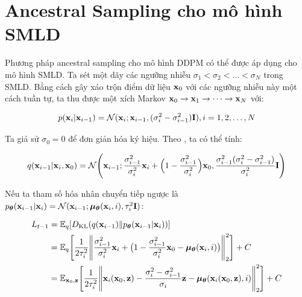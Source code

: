 \documentclass{article} %
\begin{document}
\section{Ancestral Sampling cho mô hình SMLD} \label{F}

Phương pháp ancestral sampling cho mô hình DDPM có thể được áp dụng cho mô hình SMLD.
Ta sét một dãy các ngưỡng nhiễu $\sigma_1 < \sigma_2 < \dots < \sigma_N$ trong SMLD.
Bằng cách gây xáo trộn điểm dữ liệu $\bold{x}_0$ với các ngưỡng nhiễu này một cách tuần tự, ta thu được một xích Markov $\bold{x}_0 \rightarrow \bold{x}_1 \rightarrow \dots \rightarrow \bold{x}_N$ với:

\begin{equation*}
    p(\bold{x}_i \vert \bold{x}_{i-1}) = \mathcal{N}(\bold{x}_i; \bold{x}_{i-1}, (\sigma_i^2 - \sigma_{i-1}^2) \bold{I}), i = 1, 2, \dots, N
\end{equation*}

Ta giả sử $\sigma_0 = 0$ để đơn giản hóa ký hiệu.
Theo \citep{ho2020denoising}, ta có thể tính:

\begin{equation*}
    q(\bold{x}_{i-1} \vert \bold{x}_i, \bold{x}_0) = \mathcal{N} \Bigg( \bold{x}_{i-1}; \dfrac{\sigma_{i-1}^2}{\sigma_i^2} \bold{x}_i + \Big( 1 - \dfrac{\sigma_{i-1}^2}{\sigma_i^2} \Big) \bold{x}_0, \dfrac{\sigma_{i-1}^2 (\sigma_i^2 - \sigma_{i-1}^2)}{\sigma_i^2} \bold{I} \Bigg)
\end{equation*}

Nếu ta tham số hóa nhân chuyển tiếp ngược là $p_{\boldsymbol{\theta}}(\bold{x}_{i-1} \vert \bold{x}_i)=\mathcal{N}(\bold{x}_{i-1}; \boldsymbol{\mu}_{\boldsymbol{\theta}}(\bold{x}_i, i), \tau_i^2 \bold{I})$:

\begin{equation*}
    \begin{aligned}
        L_{t-1} &= \mathbb{E}_q \lbrack D_{\mathrm{KL}}(q(\bold{x}_{i-1}) \Vert p_{\boldsymbol{\theta}}(\bold{x}_{i-1} \vert \bold{x}_i)) \rbrack \\
        &= \mathbb{E}_q \Bigg \lbrack \dfrac{1}{2 \tau_i^2} \Bigg \lVert \dfrac{\sigma_{i-1}^2}{\sigma_i^2} \bold{x}_i + \big(1 - \dfrac{\sigma_{i-1}^2}{\sigma_i^2} \bold{x}_0 - \boldsymbol{\mu}_{\boldsymbol{\theta}} (\bold{x}_i, i) \big) \Bigg \rVert_2^2 \Bigg \rbrack + C \\
        &= \mathbb{E}_{\bold{x}_0, \bold{z}} \Bigg \lbrack \dfrac{1}{2 \tau_i^2} \Bigg \lVert \bold{x}_i(\bold{x}_0, \bold{z}) - \dfrac{\sigma_i^2 - \sigma_{i-1}^2}{\sigma_i} \bold{z} - \boldsymbol{\mu}_{\boldsymbol{\theta}} (\bold{x}_i (\bold{x}_0, \bold{z}), i) \Bigg \rVert_2^2 \Bigg \rbrack + C
    \end{aligned}
\end{equation*}
\end{document}
